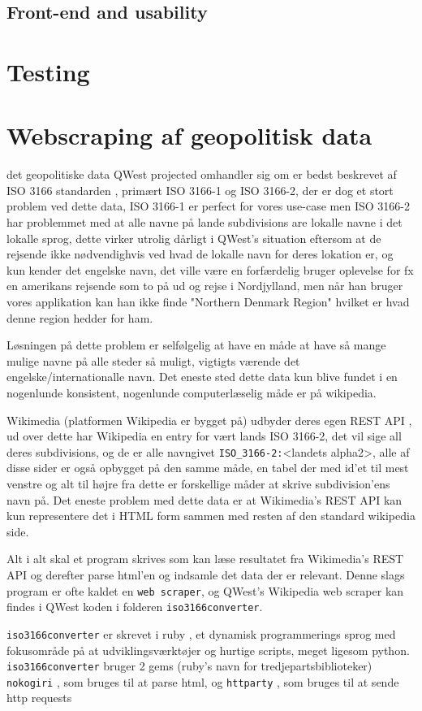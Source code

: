 \subsection{Front-end and usability}\label{sec:frontend}


\section{Testing}\label{sec:testing}

\section{Webscraping af geopolitisk data}\label{sec:datascraping}
det geopolitiske data QWest projected omhandler sig om er bedst beskrevet af ISO 3166 standarden \cite{ISO3166}, primært ISO 3166-1 og ISO 3166-2, der er dog et stort problem ved dette data, ISO 3166-1 er perfect for vores use-case men ISO 3166-2 har problemmet med at alle navne på lande subdivisions are lokalle navne i det lokalle sprog, dette virker utrolig dårligt i QWest's situation eftersom at de rejsende ikke nødvendighvis ved hvad de lokalle navn for deres lokation er, og kun kender det engelske navn, det ville være en forfærdelig bruger oplevelse for fx en amerikans rejsende som to på ud og rejse i Nordjylland, men når han bruger vores applikation kan han ikke finde "Northern Denmark Region" hvilket er hvad denne region hedder for ham.

Løsningen på dette problem er selfølgelig at have en måde at have så mange mulige navne på alle steder så muligt, vigtigts værende det engelske/internationalle navn. Det eneste sted dette data kun blive fundet i en nogenlunde konsistent, nogenlunde computerlæselig måde er på wikipedia.

Wikimedia (platformen Wikipedia er bygget på) udbyder deres egen REST API \cite{Wikimedia-REST-API-Documentation}, ud over dette har Wikipedia en entry for vært lands ISO 3166-2, det vil sige all deres subdivisions, og de er alle navngivet \texttt{ISO\_3166-2:}<landets alpha2>, alle af disse sider er også opbygget på den samme måde, en tabel der med id'et til mest venstre og alt til højre fra dette er forskellige måder at skrive subdivision'ens navn på. Det eneste problem med dette data er at Wikimedia's REST API kan kun representere det i HTML form sammen med resten af den standard wikipedia side.

Alt i alt skal et program skrives som kan læse resultatet fra Wikimedia's REST API og derefter parse html'en og indsamle det data der er relevant. 
Denne slags program er ofte kaldet en \texttt{web scraper}, og QWest's Wikipedia web scraper kan findes i QWest koden i folderen \texttt{iso3166converter}.

\texttt{iso3166converter} er skrevet i ruby \cite{RubyLang}, et dynamisk programmerings sprog med fokusområde på at udviklingsværktøjer og hurtige scripts, meget ligesom python. \texttt{iso3166converter} bruger 2 gems (ruby's navn for tredjepartsbiblioteker) \texttt{nokogiri} \cite{nokogiri}, som bruges til at parse html, og \texttt{httparty} \cite{httparty}, som bruges til at sende http requests 